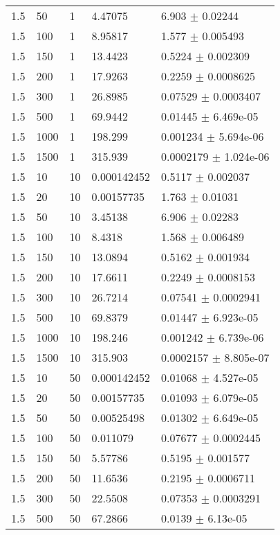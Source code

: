 \begin{longtable}{lllll}
 1.5 &    50 &     1 &  4.47075 &    6.903 $\pm$  0.02244 \\
 1.5 &   100 &     1 &  8.95817 &    1.577 $\pm$ 0.005493 \\
 1.5 &   150 &     1 &  13.4423 &   0.5224 $\pm$ 0.002309 \\
 1.5 &   200 &     1 &  17.9263 &   0.2259 $\pm$ 0.0008625 \\
 1.5 &   300 &     1 &  26.8985 &  0.07529 $\pm$ 0.0003407 \\
 1.5 &   500 &     1 &  69.9442 &  0.01445 $\pm$ 6.469e-05 \\
 1.5 &  1000 &     1 &  198.299 & 0.001234 $\pm$ 5.694e-06 \\
 1.5 &  1500 &     1 &  315.939 & 0.0002179 $\pm$ 1.024e-06 \\
 1.5 &    10 &    10 & 0.000142452 &   0.5117 $\pm$ 0.002037 \\
 1.5 &    20 &    10 & 0.00157735 &    1.763 $\pm$  0.01031 \\
 1.5 &    50 &    10 &  3.45138 &    6.906 $\pm$  0.02283 \\
 1.5 &   100 &    10 &   8.4318 &    1.568 $\pm$ 0.006489 \\
 1.5 &   150 &    10 &  13.0894 &   0.5162 $\pm$ 0.001934 \\
 1.5 &   200 &    10 &  17.6611 &   0.2249 $\pm$ 0.0008153 \\
 1.5 &   300 &    10 &  26.7214 &  0.07541 $\pm$ 0.0002941 \\
 1.5 &   500 &    10 &  69.8379 &  0.01447 $\pm$ 6.923e-05 \\
 1.5 &  1000 &    10 &  198.246 & 0.001242 $\pm$ 6.739e-06 \\
 1.5 &  1500 &    10 &  315.903 & 0.0002157 $\pm$ 8.805e-07 \\
 1.5 &    10 &    50 & 0.000142452 &  0.01068 $\pm$ 4.527e-05 \\
 1.5 &    20 &    50 & 0.00157735 &  0.01093 $\pm$ 6.079e-05 \\
 1.5 &    50 &    50 & 0.00525498 &  0.01302 $\pm$ 6.649e-05 \\
 1.5 &   100 &    50 & 0.011079 &  0.07677 $\pm$ 0.0002445 \\
 1.5 &   150 &    50 &  5.57786 &   0.5195 $\pm$ 0.001577 \\
 1.5 &   200 &    50 &  11.6536 &   0.2195 $\pm$ 0.0006711 \\
 1.5 &   300 &    50 &  22.5508 &  0.07353 $\pm$ 0.0003291 \\
 1.5 &   500 &    50 &  67.2866 &   0.0139 $\pm$ 6.13e-05 \\

\end{longtable}
